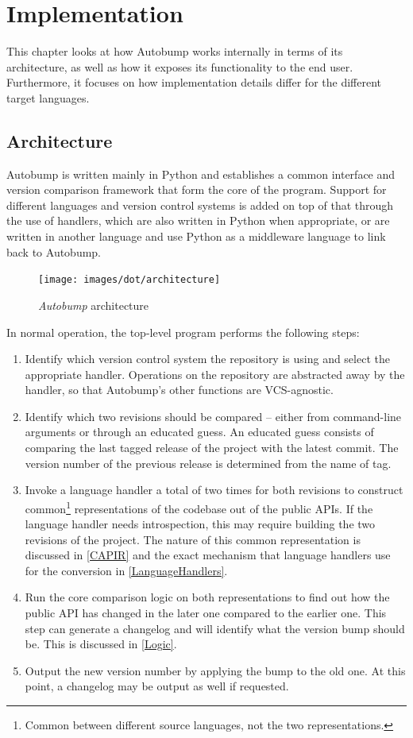 \documentclass{l4proj}
\begin{document}
\chapter{Implementation}
\label{Implementation}

This chapter looks at how Autobump works internally in terms of its
architecture, as well as how it exposes its functionality to the end
user. Furthermore, it focuses on how implementation details differ for
the different target languages.

\section{Architecture}
\label{Architecture}

Autobump is written mainly in Python and establishes a common
interface and version comparison framework that form the core of the
program. Support for different languages and version control systems
is added on top of that through the use of handlers, which are also
written in Python when appropriate, or are written in another language
and use Python as a middleware language to link back to Autobump.

\begin{figure}
\label{ArchitectureFig}
\centering
\texttt{[image: images/dot/architecture]}
\caption{\textit{Autobump} architecture}
\end{figure}

In normal operation, the top-level program performs the
following steps:

\begin{enumerate}
\item Identify which version control system the repository is using
and select the appropriate handler. Operations on the repository are
abstracted away by the handler, so that Autobump's other functions are
VCS-agnostic.
\item Identify which two revisions should be compared -- either from
command-line arguments or through an educated guess. An educated guess
consists of comparing the last tagged release of the project with the
latest commit. The version number of the previous release is
determined from the name of tag.
\item Invoke a language handler a total of two times for both
revisions to construct common\footnote{Common between different
source languages, not the two representations.} representations of the
codebase out of the public APIs. If the language handler needs
introspection, this may require building the two revisions of the project.
The nature of this common representation is discussed in \ref{CAPIR}
and the exact mechanism that language handlers use for the conversion
in \ref{LanguageHandlers}.
\item Run the core comparison logic on both representations to find
out how the public API has changed in the later one compared to the
earlier one. This step can generate a changelog and will identify what
the version bump should be. This is discussed in \ref{Logic}.
\item Output the new version number by applying the bump to the old
one. At this point, a changelog may be output as well if requested.
\end{enumerate}
\end{document}
